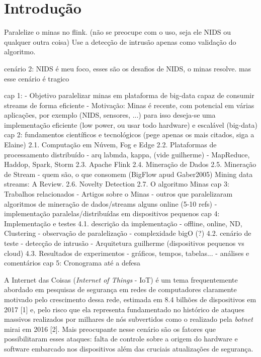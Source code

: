 \chapter{Introdução}

Paralelize o minas no flink.
(não se preocupe com o uso, seja ele NIDS ou qualquer outra coisa)
Use a detecção de intrusão apenas como validação do algoritmo.

cenário 2: NIDS é meu foco, esses são os desafios de NIDS, o minas resolve. mas esse cenário é tragico

cap 1:
    - Objetivo paralelizar minas em plataforma de big-data capaz de consumir streams de forma eficiente
    - Motivação: Minas é recente, com potencial em várias aplicações, por exemplo (NIDS, sensores, ...)
        para isso deseja-se uma implementação eficiente (low power, ou usar todo hardware) e escalável (big-data)
cap 2: fundamentos científicos e tecnológicos
    (pege apenas os mais citados, siga a Elaine)
    2.1. Computação em Núvem, Fog e Edge
    2.2. Plataformas de processamento distribuído
        - arq labmda, kappa, (vide guilherme)
        - MapReduce, Haddop, Spark, Storm
    2.3. Apache Flink
    2.4. Mineração de Dados
    2.5. Mineração de Stream
        - quem são, o que consomem
        (BigFlow apud Gaber2005) Mining data streams: A Review.
    2.6. Novelty Detection
    2.7. O algoritmo Minas
cap 3: Trabalhos relacionados
    - Artigos sobre o Minas
    - outros que paralelizaram algoritmos de mineração de dados/streams alguns online (5-10 refs)
    - implementação paralelas/distribuídas em dispositivos pequenos
cap 4: Implementação e testes
    4.1. descrição da implementação
        - offline, online, ND, Clustering
        - observação de paralelização
        - complexidade bigO (?)
    4.2. cenário de teste 
        - detecção de intrusão
        - Arquitetura guilherme (dispositivos pequenos vs cloud)
    4.3. Resultados de experimentos
        - gráficos, tempos, tabelas...
        - análises e comentários
cap 5: Cronograma até a defesa

A Internet das Coisas (\emph{Internet of Things} - IoT) é um tema frequentemente
abordado em pesquisas de segurança em redes de computadores claramente motivado
pelo crescimento dessa rede, estimada em 8.4 bilhões de dispositivos em 2017
[1] e, pelo risco que ela representa fundamentado no histórico de ataques
massivos realizados por milhares de nós subvertidos como o realizado pela \emph{botnet}
mirai em 2016 [2]. Mais preocupante nesse cenário são os fatores que
possibilitaram esses ataques: falta de controle sobre a origem do hardware e
software embarcado nos dispositivos além das cruciais atualizações de segurança.


